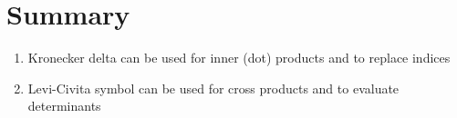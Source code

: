 
\section{Summary}

\begin{enumerate}
\item Kronecker delta can be used for inner (dot) products and to replace indices
\item Levi-Civita symbol can be used for cross products and to evaluate determinants
\end{enumerate}




